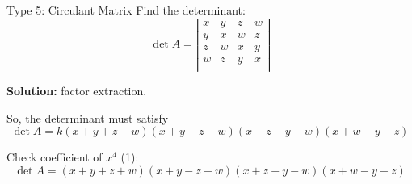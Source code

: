 \documentclass{beamer}
\begin{document}
\begin{frame}{Type 5: Circulant Matrix}
Find the determinant:
\begin{equation*}
    \det A=\left| \begin{matrix}
        x&		y&		z&		w\\
        y&		x&		w&		z\\
        z&		w&		x&		y\\
        w&		z&		y&		x\\
    \end{matrix} \right|
\end{equation*}

\textbf{Solution:} factor extraction.

\vspace{3pt}
So, the determinant must satisfy
\begin{equation*}
    \det A=k\left( x+y+z+w \right) \left( x+y-z-w \right) \left( x+z-y-w \right) \left( x+w-y-z \right)
\end{equation*}

Check coefficient of $x^4$ (1):
\begin{equation*}
    \det A=\left( x+y+z+w \right) \left( x+y-z-w \right) \left( x+z-y-w \right) \left( x+w-y-z \right)
\end{equation*}
\end{frame}
\end{document}
